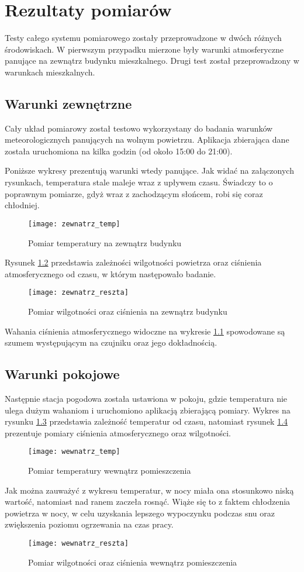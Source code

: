 \chapter{Rezultaty pomiarów}
Testy całego systemu pomiarowego zostały przeprowadzone w dwóch różnych środowiskach. W pierwszym przypadku mierzone były warunki atmosferyczne panujące na zewnątrz budynku mieszkalnego. Drugi test został przeprowadzony w warunkach mieszkalnych.
\section*{Warunki zewnętrzne}
Cały układ pomiarowy został testowo wykorzystany do badania warunków  meteorologicznych panujących na wolnym powietrzu. Aplikacja zbierająca dane została uruchomiona na kilka godzin (od około 15:00 do 21:00).

Poniższe wykresy prezentują warunki wtedy panujące. Jak widać na załączonych rysunkach, temperatura stale maleje wraz z upływem czasu. Świadczy to o poprawnym pomiarze, gdyż wraz z zachodzącym słońcem, robi się coraz chłodniej.
\begin{figure}[h!]
\centering
\texttt{[image: zewnatrz\_temp]}
\caption{Pomiar temperatury na zewnątrz budynku}
\label{fig:zewnatrz_temp}
\end{figure}

Rysunek \ref{fig:zewnatrz_reszta} przedstawia zależności wilgotności powietrza oraz ciśnienia atmosferycznego od czasu, w którym następowało badanie.
\begin{figure}[h!]
\centering
\texttt{[image: zewnatrz\_reszta]}
\caption{Pomiar wilgotności oraz ciśnienia na zewnątrz budynku}
\label{fig:zewnatrz_reszta}
\end{figure}

Wahania ciśnienia atmosferycznego widoczne na wykresie \ref{fig:zewnatrz_temp} spowodowane są szumem występującym na czujniku oraz jego dokładnością.

\section*{Warunki pokojowe}
Następnie stacja pogodowa została ustawiona w pokoju, gdzie temperatura nie ulega dużym wahaniom i uruchomiono aplikacją zbierającą pomiary. Wykres na rysunku \ref{fig:wewnatrz_temp} przedstawia zależność temperatur od czasu, natomiast rysunek \ref{fig:wewnatrz_reszta} prezentuje pomiary ciśnienia atmosferycznego oraz wilgotności.
\begin{figure}[h!]
\centering
\texttt{[image: wewnatrz\_temp]}
\caption{Pomiar temperatury wewnątrz pomieszczenia}
\label{fig:wewnatrz_temp}
\end{figure}
Jak można zauważyć z wykresu temperatur, w nocy miała ona stosunkowo niską wartość, natomiast nad ranem zaczeła rosnąć. Wiąże się to z faktem chłodzenia powietrza w nocy, w celu uzyskania lepszego wypoczynku podczas snu oraz zwiększenia poziomu ogrzewania na czas pracy.

\begin{figure}[h!]
\centering
\texttt{[image: wewnatrz\_reszta]}
\caption{Pomiar wilgotności oraz ciśnienia wewnątrz pomieszczenia}
\label{fig:wewnatrz_reszta}
\end{figure}